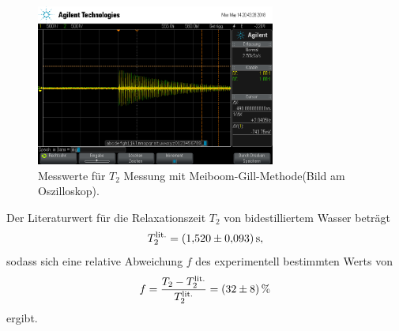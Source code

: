 \begin{figure}[hhh]
  \centering
  \includegraphics[width=0.7\textwidth]{mg.png}
  \caption{Messwerte für $T_{2}$ Messung mit Meiboom-Gill-Methode(Bild am Oszilloskop).}
  \label{fig:meiboomgill}
\end{figure}

Der Literaturwert\cite{litwerte} für die Relaxationszeit $T_{2}$ von bidestilliertem Wasser
beträgt
\begin{align*}
  T_{2}^\text{lit.} = \SI{1.52+-0.093}{\second},
\end{align*}
sodass sich eine relative Abweichung $f$ des experimentell bestimmten Werts
von
\begin{align*}
  f = \frac{T_{2} - T_{2}^\text{lit.}}{T_{2}^\text{lit.}} = \SI{32+-8}{\percent}
\end{align*}
ergibt.


